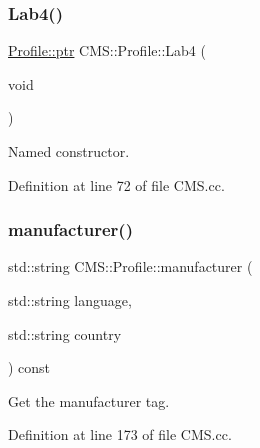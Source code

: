 \mbox{\label{class_c_m_s_1_1_profile_a8623f68331080ea5e1aef2f595e9ae00}} 
\subsubsection{\texorpdfstring{Lab4()}{Lab4()}}
{\footnotesize\ttfamily \hyperlink{class_c_m_s_1_1_profile_a7d5a80e1317d17dbfdf5ae69820ab08b}{Profile\+::ptr} C\+M\+S\+::\+Profile\+::\+Lab4 (\begin{DoxyParamCaption}\item[{void}]{ }\end{DoxyParamCaption})\hspace{0.3cm}{\ttfamily [static]}}



Named constructor. 



Definition at line 72 of file C\+M\+S.\+cc.

\mbox{\label{class_c_m_s_1_1_profile_a1fbb59d9f6e769da91b34b4d38fa4e57}} 
\subsubsection{\texorpdfstring{manufacturer()}{manufacturer()}}
{\footnotesize\ttfamily std\+::string C\+M\+S\+::\+Profile\+::manufacturer (\begin{DoxyParamCaption}\item[{std\+::string}]{language,  }\item[{std\+::string}]{country }\end{DoxyParamCaption}) const}



Get the manufacturer tag. 



Definition at line 173 of file C\+M\+S.\+cc.

\mbox{\label{class_c_m_s_1_1_profile_adabc31854f8bad3fff001bf1c368f578}} 
